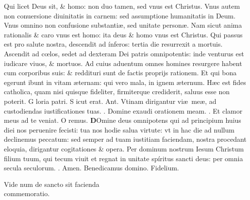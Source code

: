 \documentclass[a5paper,10pt]{book}
\def\ae{æ}
\def\oe{œ}
\begin{document}
\begin{multicols*}{2}
\newline \color{red} Q\color{black}ui licet Deus sit, \& homo: non duo tamen, sed vnus est Christus.
\newline \color{red} V\color{black}nus autem non conuersione diuinitatis in carnem: sed assumptione humanitatis in Deum.
\newline \color{red} V\color{black}nus omnino non confusione substanti\ae , sed unitate person\ae .
\newline \color{red} N\color{black}am sicut anima rationalis \& caro vnus est homo: ita deus \& homo vnus est Christus.
\newline \color{red} Q\color{black}ui passus est pro salute nostra, descendit ad ínferos: tertia die resurrexit a mortuis.
\newline \color{red} A\color{black}scendit ad c\oe los, sedet ad dexteram Dei patris omnipotentis: inde venturus est iudicare viuos, \& mortuos.
\newline \color{red} A\color{black}d cuius aduentum omnes homines resurgere habent cum corporibus suis: \& reddituri sunt de factis proprijs rationem.
\newline \color{red} E\color{black}t qui bona egerunt ibunt in vitam \ae ternam: qui vero mala, in ignem \ae ternum.
\newline \color{red} H\color{black}\ae c est fides catholica, quam nisi quisque fideliter, firmiterque crediderit, saluus esse non poterit.
\newline \color{red} G\color{black} loria patri. \color{red} S\color{black} icut erat. \color{red} Ant. \color{black} Vtinam dirigantur vi\ae \ me\ae , ad custodiendas iustificationes tuas. \color{red} \Vbar . \color{black} Domine exaudi orationem meam. \color{red} \Rbar . \color{black} Et clamor meus ad te veniat.
\newline \color{red} O\color{black} remus.
\lettrine[lines=2]{\bfseries \color{red} D}{}Omine deus omnipotens qui ad principium huius diei nos peruenire fecisti: tua nos hodie salua virtute: vt in hac die ad nullum declinemus peccatum: sed semper ad tuam iustitiam faciendam, nostra procedant eloquia, dirigantur cogitationes \& opera. Per dominum nostrum Iesum Christum filium tuum, qui tecum viuit et regnat in unitate spíritus sancti deus: per omnia secula seculorum. \color{red} \Rbar . \color{black} Amen. Benedicamus domino. Fidelium.
\vspace{-1em}
\begin{center} \color{red}
Vide num de sancto sit facienda\\commemoratio.

\end{center}
\end{multicols*}
\end{document}
